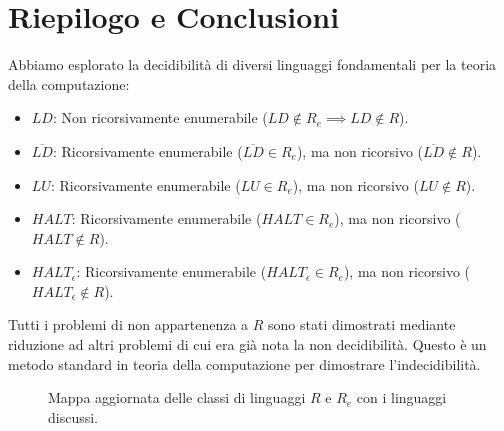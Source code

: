 \documentclass[a4paper]{article}
\begin{document}
\section{Riepilogo e Conclusioni}
Abbiamo esplorato la decidibilità di diversi linguaggi fondamentali per la teoria della computazione:
\begin{itemize}
    \item $LD$: Non ricorsivamente enumerabile ($LD \notin R_e \implies LD \notin R$).
    \item $\overline{LD}$: Ricorsivamente enumerabile ($\overline{LD} \in R_e$), ma non ricorsivo ($\overline{LD} \notin R$).
    \item $LU$: Ricorsivamente enumerabile ($LU \in R_e$), ma non ricorsivo ($LU \notin R$).
    \item $HALT$: Ricorsivamente enumerabile ($HALT \in R_e$), ma non ricorsivo ($HALT \notin R$).
    \item $HALT_\epsilon$: Ricorsivamente enumerabile ($HALT_\epsilon \in R_e$), ma non ricorsivo ($HALT_\epsilon \notin R$).
\end{itemize}
Tutti i problemi di non appartenenza a $R$ sono stati dimostrati mediante riduzione ad altri problemi di cui era già nota la non decidibilità. Questo è un metodo standard in teoria della computazione per dimostrare l'indecidibilità.

\begin{figure}[h!]
    \centering
    \caption{Mappa aggiornata delle classi di linguaggi $R$ e $R_e$ con i linguaggi discussi.}
    \label{fig:r_re_map_updated}
\end{figure}
\end{document}
